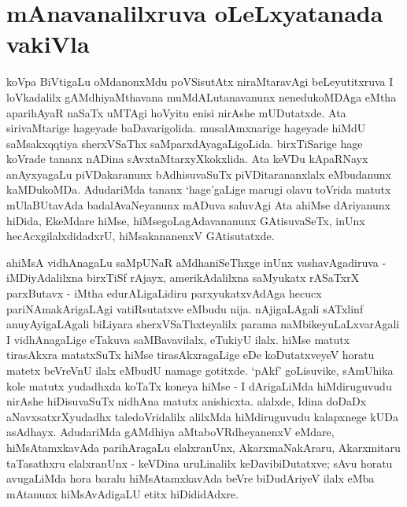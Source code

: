 \makeatletter
\def\@makechapterhead#1{%
  \vspace*{10\p@}%
{\fontsize{13pt}{13pt}\selectfont\raggedright{\bf  bArfbarA vADfR jAkfsanf}\par}
\vspace*{25\p@}%
  {\parindent \z@ \centering \normalfont
    \ifnum \c@secnumdepth >\m@ne
      \if@mainmatter
        {\LARGE\bfseries  #1}\par\nobreak
	\vskip 4pt
      \fi
    \fi
\smallskip 

 \vskip 10\p@  
{\fontsize{12pt}{12pt}\selectfont\raggedleft{anu: \bf pu.ti.na.}\par}
  }
\vskip 40\p@}
\makeatother


\chapter{mAnavanalilxruva oLeLxyatanada vakiVla}\label{chap1}



koVpa BiVtigaLu oMdanonxMdu poVSisutAtx niraMtaravAgi beLeyutitxruva I loVka\-dalilx gAMdhiyaMthavana muMdALutanavanunx nenedukoMDAga eMtha aparihAyaR naSaTx uMTAgi hoVyitu enisi nirAshe mUDutatxde. Ata sirivaMtarige hageyade baDavari\-golida. musalAmxnarige hageyade hiMdU saMsakxqqtiya sherxVSaThx saMparxdA\-yagaLi\-goLida. birxTiSarige hage koVrade tananx nADina sAvxtaMtarxyXkokxlida. Ata keVDu kApaRNayx anAyxyagaLu piVDakaranunx bAdhisuvaSuTx piVDitarananxlalx eMbudanunx kaMDukoMDa. AdudariMda tananx `hage'gaLige marugi olavu toVrida matutx mUlaBUtavAda badalAvaNeyanunx mADuva saluvAgi Ata ahiMse dAriyanunx hiDida, EkeMdare hiMse, hiMsegoLagAdavananunx GAtisuvaSeTx, inUnx hecAcxgilalxdidadxrU, hiMsakananenxV GAtisutatxde.

ahiMsA vidhAnagaLu saMpUNaR aMdhaniSeThxge inUnx vashavAgadiruva - iMDiyAdalilxna birxTiSf rAjayx, amerikAdalilxna saMyukatx rASaTxrX parxButavx - iMtha edurALigaLidiru parxyukatxvAdAga hecucx pariNAmakArigaLAgi vatiRsutatxve eMbudu nija. nAjigaLAgali sATxlinf anuyAyigaLAgali biLiyara sherxVSaThxteyalilx parama naMbikeyuLaLxvarAgali I vidhAnagaLige eTakuva saMBavavilalx, eTukiyU ilalx. hiMse matutx tirasAkxra matatxSuTx hiMse tirasAkxragaLige eDe koDutatxveyeV horatu matetx beVreVnU ilalx eMbudU namage gotitxde. `pAkf' goLisuvike, sAmUhika kole matutx yudadhxda koTaTx koneya hiMse - I dArigaLiMda hiMdiruguvudu nirAshe hiDisuvaSuTx nidhAna matutx anishicxta. alalxde, Idina doDaDx aNavxsatxrXyudadhx taledoVridalilx alilxMda hiMdiruguvudu kalapxnege kUDa asAdhayx. AdudariMda gAMdhiya aMtaboVRdheyanenxV eMdare, hiMsAtamxkavAda parihAragaLu elalxranUnx, AkarxmaNakAraru, Akarxmitaru taTasathxru elalxranUnx - keVDina uruLinalilx  keDavibiDutatxve; sAvu horatu avugaLiMda hora baralu hiMsAtamxkavAda beVre biDudAriyeV ilalx eMba mAtanunx hiMsAvAdigaLU etitx hiDididAdxre.

